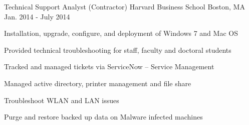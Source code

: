 \begin{cventries}
  \cventry
    {Technical Support Analyst (Contractor)} %
    {Harvard Business School} %
    {Boston, MA} %
    {Jan. 2014 - July 2014} %
    {
      \begin{cvitems} %
        \item {Installation, upgrade, configure, and deployment of Windows 7 and Mac OS}
		    \item {Provided technical troubleshooting for staff, faculty and doctoral students}
		    \item {Tracked and managed tickets via ServiceNow – Service Management}
		    \item {Managed active directory, printer management and file share}
		    \item {Troubleshoot WLAN and LAN issues}
		    \item {Purge and restore backed up data on Malware infected machines}
      \end{cvitems}
    }
   
\end{cventries}

